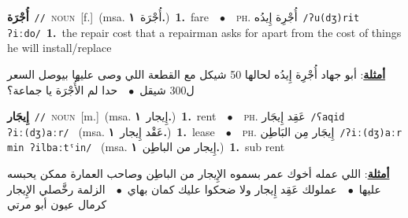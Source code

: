 \documentclass[10pt,a4paper,twoside]{article} %
\begin{document}
\begin{multicols}{2}
{{{{{\setlength\topsep{0pt}\textbf{\foreignlanguage{arabic}{أُجْرَة}}\ {\color{gray}\texttt{//}\color{black}}\ \textsc{noun}\ [f.]\ \color{gray}(msa. \foreignlanguage{arabic}{أُجْرَة}~\foreignlanguage{arabic}{\textbf{١.}})\color{black}\ \textbf{1.}~fare\ \ $\bullet$\ \ \textsc{ph.} \color{gray} \foreignlanguage{arabic}{أُجْرِة إِيدُه}\color{black}\ {\color{gray}\texttt{/{\sffamily ʔu(dʒ)rit ʔiːdo}/}\color{black}}\ \textbf{1.}~the repair cost that a repairman asks for apart from the cost of things he will install/replace\  \begin{flushright}\color{gray}\foreignlanguage{arabic}{\textbf{\underline{\foreignlanguage{arabic}{أمثلة}}}: أبو جهاد أُجْرِة إِيدُه لحالها 50 شيكل مع القطعة اللي وصى عليها بيوصل السعر ل300 شيقل\ $\bullet$\ \  حدا لم الأُجْرَة يا جماعة؟}\end{flushright}\color{black}} \vspace{2mm}

{\setlength\topsep{0pt}\textbf{\foreignlanguage{arabic}{إِيجَار}}\ {\color{gray}\texttt{//}\color{black}}\ \textsc{noun}\ [m.]\ \color{gray}(msa. \foreignlanguage{arabic}{إِيجار}~\foreignlanguage{arabic}{\textbf{١.}})\color{black}\ \textbf{1.}~rent\ \ $\bullet$\ \ \textsc{ph.} \color{gray} \foreignlanguage{arabic}{عَقِد إِيجَار}\color{black}\ {\color{gray}\texttt{/{\sffamily ʕaqid ʔiː(dʒ)aːr}/}\color{black}}\ \color{gray} (msa. \foreignlanguage{arabic}{عَقْد إِيجار}~\foreignlanguage{arabic}{\textbf{١.}})\color{black}\ \textbf{1.}~lease\ \ $\bullet$\ \ \textsc{ph.} \color{gray} \foreignlanguage{arabic}{إِيجَار مِن البَاطِن}\color{black}\ {\color{gray}\texttt{/{\sffamily ʔiː(dʒ)aːr min ʔilbaːtˤin}/}\color{black}}\ \color{gray} (msa. \foreignlanguage{arabic}{إِيجار من الباطِن}~\foreignlanguage{arabic}{\textbf{١.}})\color{black}\ \textbf{1.}~sub rent\  \begin{flushright}\color{gray}\foreignlanguage{arabic}{\textbf{\underline{\foreignlanguage{arabic}{أمثلة}}}: اللي عمله أخوك عمر بسموه الإِيجار من الباطِن وصاحب العمارة ممكن يحبسه عليها\ $\bullet$\ \  عملولك عَقِد إِيجار ولا ضحكوا عليك كمان بهاي\ $\bullet$\ \  الزلمة رخَّصلي الإِيجار كرمال عيون أبو مرتي}\end{flushright}\color{black}} \vspace{2mm}

}}}}
\end{multicols}
\end{document}
